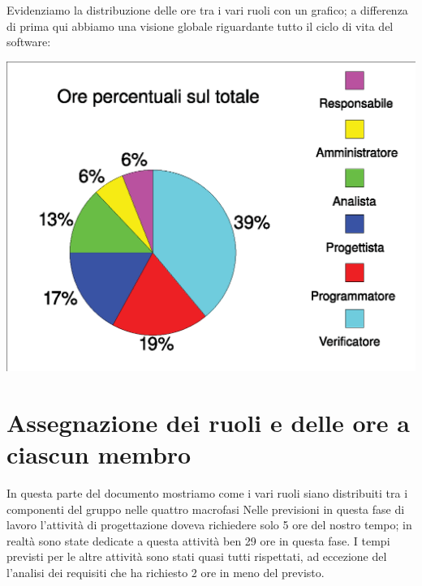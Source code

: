 \documentclass[11pt,titlepage,a4paper]{report}
\begin{document}
Evidenziamo la distribuzione delle ore tra i vari ruoli con un grafico; 
a differenza di prima qui abbiamo una visione globale riguardante 
tutto il ciclo di vita del software:


\begin{center}
\includegraphics [width=1\textwidth] {orePercentuali.eps}
\end{center}


\section{Assegnazione dei ruoli e delle ore a ciascun membro}
In questa parte del documento mostriamo come i vari ruoli siano distribuiti 
tra i componenti del gruppo nelle quattro macrofasi
Nelle previsioni in questa fase di lavoro l'attivit\`a di progettazione 
doveva richiedere solo 5 ore del nostro tempo; in realt\`a sono state 
dedicate a questa attivit\`a ben 29 ore in questa fase. I tempi previsti
per le altre attivit\`a sono stati quasi tutti rispettati, ad eccezione del
l'analisi dei requisiti che ha richiesto 2 ore in meno del previsto.
\end{document}
